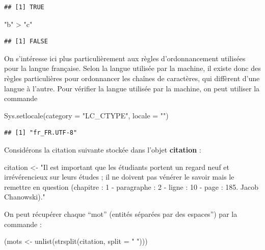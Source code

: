 \documentclass[
]{book}
\newenvironment{Shaded}{\begin{snugshade}}{\end{snugshade}}
\newcommand{\AttributeTok}[1]{\textcolor[rgb]{0.77,0.63,0.00}{#1}}
\newcommand{\FunctionTok}[1]{\textcolor[rgb]{0.00,0.00,0.00}{#1}}
\newcommand{\NormalTok}[1]{#1}
\newcommand{\OtherTok}[1]{\textcolor[rgb]{0.56,0.35,0.01}{#1}}
\newcommand{\SpecialCharTok}[1]{\textcolor[rgb]{0.00,0.00,0.00}{#1}}
\newcommand{\StringTok}[1]{\textcolor[rgb]{0.31,0.60,0.02}{#1}}
\theoremstyle{definition}
\theoremstyle{definition}
\theoremstyle{definition}
\theoremstyle{definition}
\theoremstyle{remark}
\begin{document}
\begin{verbatim}
## [1] TRUE
\end{verbatim}

\begin{Shaded}
\begin{Highlighting}[]
\StringTok{"b"} \SpecialCharTok{\textgreater{}} \StringTok{"c"}
\end{Highlighting}
\end{Shaded}

\begin{verbatim}
## [1] FALSE
\end{verbatim}

On s'intéresse ici plus particulièrement aux règles d'ordonnancement utilisées pour la langue française. Selon la langue utilisée par la machine, il existe donc des règles particulières pour ordonnancer les chaînes de caractères, qui diffèrent d'une langue à l'autre. Pour vérifier la langue utilisée par la machine, on peut utiliser la commande

\begin{Shaded}
\begin{Highlighting}[]
\FunctionTok{Sys.setlocale}\NormalTok{(}\AttributeTok{category =} \StringTok{"LC\_CTYPE"}\NormalTok{, }\AttributeTok{locale =} \StringTok{""}\NormalTok{)}
\end{Highlighting}
\end{Shaded}

\begin{verbatim}
## [1] "fr_FR.UTF-8"
\end{verbatim}

Considérons la citation suivante stockée dans l'objet \textbf{citation} :

\begin{Shaded}
\begin{Highlighting}[]
\NormalTok{citation }\OtherTok{\textless{}{-}} \StringTok{"Il est important que les étudiants portent un regard neuf }
\StringTok{et irrévérencieux  sur leurs études ; il ne doivent pas vénérer le savoir }
\StringTok{mais le remettre en question (chapitre : 1 {-} paragraphe : 2 {-} ligne : 10 }
\StringTok{{-} page : 185. Jacob Chanowski)."}
\end{Highlighting}
\end{Shaded}

On peut récupérer chaque ``mot'' (entités séparées par des espaces'') par la commande :

\begin{Shaded}
\begin{Highlighting}[]
\NormalTok{(mots }\OtherTok{\textless{}{-}} \FunctionTok{unlist}\NormalTok{(}\FunctionTok{strsplit}\NormalTok{(citation, }\AttributeTok{split =} \StringTok{" "}\NormalTok{)))}
\end{Highlighting}
\end{Shaded}
\end{document}
